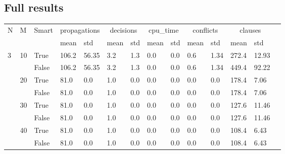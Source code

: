 \begin{appendices}
\section{Full results}
\begin{landscape}
\begin{small}
\begin{longtable}[c]{@{}lll|ll|ll|ll|ll|lll@{}}
\toprule
N  & M  & Smart & \multicolumn{2}{c}{propagations} & \multicolumn{2}{c}{decisions} & \multicolumn{2}{c}{cpu\_time} & \multicolumn{2}{c}{conflicts} & \multicolumn{2}{c}{clauses} &  \\* 
   &    &       & mean            & std            & mean          & std           & mean          & std           & mean          & std           & mean          & std         &  \\
  \midrule
\endfirsthead
%
\endhead
%
\bottomrule
\endfoot
%
\endlastfoot
%
3  & 10 & True  & 106.2           & 56.35          & 3.2           & 1.3           & 0.0           & 0.0           & 0.6           & 1.34          & 272.4         & 12.93       &  \\
   &    & False & 106.2           & 56.35          & 3.2           & 1.3           & 0.0           & 0.0           & 0.6           & 1.34          & 449.4         & 92.22       &  \\
   & 20 & True  & 81.0            & 0.0            & 1.0           & 0.0           & 0.0           & 0.0           & 0.0           & 0.0           & 178.4         & 7.06        &  \\
   &    & False & 81.0            & 0.0            & 1.0           & 0.0           & 0.0           & 0.0           & 0.0           & 0.0           & 178.4         & 7.06        &  \\
   & 30 & True  & 81.0            & 0.0            & 1.0           & 0.0           & 0.0           & 0.0           & 0.0           & 0.0           & 127.6         & 11.46       &  \\
   &    & False & 81.0            & 0.0            & 1.0           & 0.0           & 0.0           & 0.0           & 0.0           & 0.0           & 127.6         & 11.46       &  \\
   & 40 & True  & 81.0            & 0.0            & 1.0           & 0.0           & 0.0           & 0.0           & 0.0           & 0.0           & 108.4         & 6.43        &  \\
   &    & False & 81.0            & 0.0            & 1.0           & 0.0           & 0.0           & 0.0           & 0.0           & 0.0           & 108.4         & 6.43        &  \\

\end{longtable}
\end{small}
\end{landscape}
\end{appendices}
